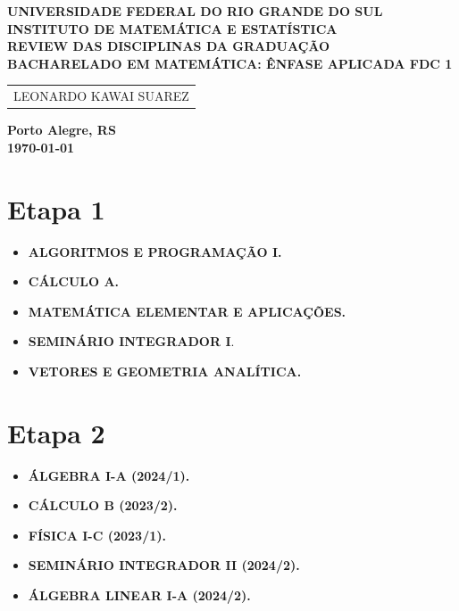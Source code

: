 \documentclass[12pt]{article}
\begin{document}
\begin{center}
    \textbf{\large UNIVERSIDADE FEDERAL DO RIO GRANDE DO SUL} \\
    \textbf{\large INSTITUTO DE MATEMÁTICA E ESTATÍSTICA} \\
    \vspace{3cm}
    \textbf{\Large REVIEW DAS DISCIPLINAS DA GRADUAÇÃO} \\
    \vspace{1cm}
    \textbf{\large BACHARELADO EM MATEMÁTICA: ÊNFASE APLICADA FDC 1} \\
    \vspace{3cm}
    
    \begin{tabular}{c}
        LEONARDO KAWAI SUAREZ        
    \end{tabular}
    
    \vfill
    \textbf{\large Porto Alegre, RS} \\
    \textbf{\large\today} \\
\end{center}\newpage

\tableofcontents\newpage

\section{Etapa 1}

\begin{itemize}
    \item \textbf{ALGORITMOS E PROGRAMAÇÃO I.}
    \item \textbf{CÁLCULO A.}
    \item \textbf{MATEMÁTICA ELEMENTAR E APLICAÇÕES.}
    \item \textbf{SEMINÁRIO INTEGRADOR I}.
    \item \textbf{VETORES E GEOMETRIA ANALÍTICA.}
\end{itemize}

\section{Etapa 2}

\begin{itemize}
    \item \textbf{ÁLGEBRA I-A (2024/1).}
    \item \textbf{CÁLCULO B (2023/2).}
    \item \textbf{FÍSICA I-C (2023/1).}
    \item \textbf{SEMINÁRIO INTEGRADOR II (2024/2).}
    \item \textbf{ÁLGEBRA LINEAR I-A (2024/2).}
\end{itemize}
\end{document}
